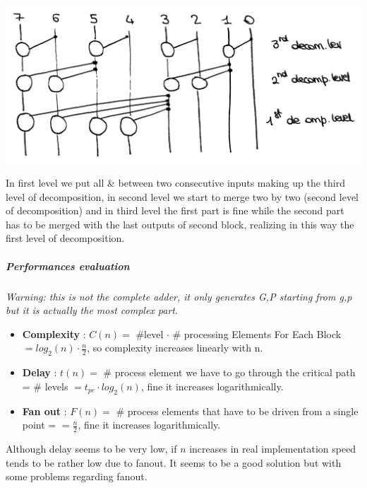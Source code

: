 \begin{center}
  \includegraphics[width=0.7\linewidth]{img/img2/21}
\end{center}

In first level we put all \& between two consecutive inputs making up the third level of decomposition, in second level we start to merge two by two (second level of decomposition)
and in third level the first part is fine while the second part has to be merged with the last outputs of second block, realizing in this way the first level of decomposition.

\subparagraph{Performances evaluation}
\textit{Warning: this is not the complete adder, it only generates G,P starting from g,p but it is actually the most complex part}.\\

\begin{itemize}
  \item \textbf{Complexity} : $ C(n) = $ \#level $\cdot$ \# processing Elements For Each Block $=log_2 (n) \cdot \frac{n}{2}$, so complexity increases linearly with n.
  \item \textbf{Delay} : $ t(n) = $ \# process element we have to go through the critical path = \# levels $= t_{pe} \cdot log_2(n)  $, fine it increases logarithmically.
  \item \textbf{Fan out} : $ F(n) = $ \# process elements that have to be driven from a single point = $= \frac{n}{2}   $, fine it increases logarithmically.

\end{itemize}

Although delay seems to be very low, if $n$ increases in real implementation speed tends to be rather low due to fanout. It seems to be a good solution but with some problems regarding fanout.



